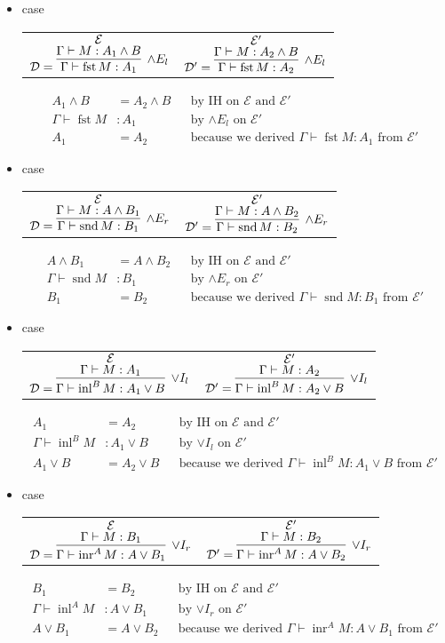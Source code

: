 \documentclass{article}
\newcommand{\D}{\mathcal{D}}
\newcommand{\E}{\mathcal{E}}
\newcommand{\proves}{\vdash}
\newcommand{\GV}{\Gamma \proves}
\DeclareMathOperator{\fst}{fst}
\DeclareMathOperator{\snd}{snd}
\DeclareMathOperator{\inl}{inl}
\DeclareMathOperator{\inr}{inr}
\begin{document}
\begin{enumerate}[label=\textbf{Exercise \arabic*}]
\begin{itemize}
\item case
\begin{tabular}{cc}
$\D = \infer[\land E_l]
  {\GV \fst M:A_1}
  {\deduce{\GV M : A_1 \land B}{\E}}$
&
$\D' = \infer[\land E_l]
  {\GV \fst M:A_2}
  {\deduce{\GV M : A_2 \land B}{\E'}}$
\end{tabular}
\begin{align*}
A_1 \land B &= A_2 \land B && \text{by IH on $\E$ and $\E'$} \\
\GV \fst M &: A_1 && \text{by $\land E_l$ on $\E'$} \\
A_1&=A_2 && \text{because we derived $\GV \fst M:A_1$ from $\E'$}
\end{align*}


\item case
\begin{tabular}{cc}
$\D = \infer[\land E_r]
  {\GV \snd M:B_1}
  {\deduce{\GV M : A \land B_1}{\E}}$
&
$\D' = \infer[\land E_r]
  {\GV \snd M:B_2}
  {\deduce{\GV M : A \land B_2}{\E'}}$
\end{tabular}
\begin{align*}
A \land B_1 &= A \land B_2 && \text{by IH on $\E$ and $\E'$} \\
\GV \snd M &: B_1 && \text{by $\land E_r$ on $\E'$} \\
B_1&=B_2 && \text{because we derived $\GV \snd M:B_1$ from $\E'$}
\end{align*}


\item case
\begin{tabular}{cc}
$\D = \infer[\lor I_l]
  {\GV \inl^B M: A_1 \lor B}
  {\deduce{\GV M : A_1}{\E}}$
&
$\D' = \infer[\lor I_l]
  {\GV \inl^B M: A_2 \lor B}
  {\deduce{\GV M : A_2}{\E'}}$
\end{tabular}
\begin{align*}
A_1 &= A_2 && \text{by IH on $\E$ and $\E'$} \\
\GV \inl^B M&: A_1 \lor B && \text{by $\lor I_l$ on $\E'$} \\
A_1 \lor B &= A_2 \lor B && \text{because we derived $\GV \inl^B M: A_1 \lor B$ from $\E'$}
\end{align*}


\item case
\begin{tabular}{cc}
$\D = \infer[\lor I_r]
  {\GV \inr^A M: A \lor B_1}
  {\deduce{\GV M : B_1}{\E}}$
&
$\D' = \infer[\lor I_r]
  {\GV \inr^A M: A \lor B_2}
  {\deduce{\GV M : B_2}{\E'}}$
\end{tabular}
\begin{align*}
B_1 &= B_2 && \text{by IH on $\E$ and $\E'$} \\
\GV \inl^A M&: A \lor B_1 && \text{by $\lor I_r$ on $\E'$} \\
A \lor B_1 &= A \lor B_2 && \text{because we derived $\GV \inr^A M: A \lor B_1$ from $\E'$}
\end{align*}



\end{itemize}
\end{enumerate}
\end{document}
